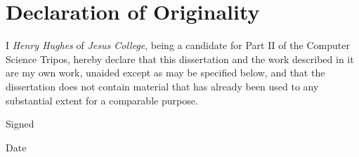 \chapter{Declaration of Originality}
I \emph{Henry Hughes} of \emph{Jesus College}, being a candidate for Part II of the Computer Science Tripos, hereby declare that this dissertation and the work described in it are my own work, unaided except as may be specified below, and that the dissertation does not contain material that has already been used to any substantial extent for a comparable purpose.

Signed 

\vspace{0.4in}

Date
